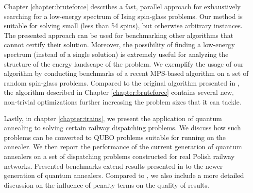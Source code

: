 Chapter \ref{chapter:bruteforce} describes a fast, parallel approach for
exhaustively searching for a low-energy spectrum of Ising spin-glass problems.
Our method is suitable for solving small (less than 54 spins), but otherwise
arbitrary instances. The presented approach can be used for benchmarking other
algorithms that cannot certify their solution. Moreover, the possibility of
finding a low-energy spectrum (instead of a single solution) is extremely
useful for analyzing the structure of the energy landscape of the problem. We
exemplify the usage of our algorithm by conducting benchmarks of a recent
MPS-based algorithm on a set of random spin-glass problems. Compared to the
original algorithm presented in \cite{bruteforce}, the algorithm described in
Chapter \ref{chapter:bruteforce} contains several new, non-trivial
optimizations further increasing the problem sizes that it can tackle.

Lastly, in chapter \ref{chapter:trains}, we present the application of quantum
annealing to solving certain railway dispatching problems. We discuss how such
problems can be converted to QUBO problems suitable for running on the
annealer. We then report the performance of the current generation of quantum
annealers on a set of dispatching problems constructed for real Polish railway
networks. Presented benchmarks extend results presented in \cite{trains} to the
newer generation of quantum annealers. Compared to \cite{trains}, we also
include a more detailed discussion on the influence of penalty terms on the
quality of results.
